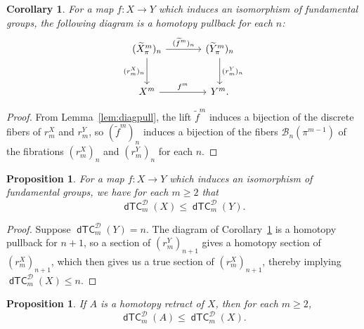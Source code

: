 \documentclass[amscd,amssymb,verbatim,11pt]{amsart}
\theoremstyle{plain}
\newtheorem{proposition}[thm]{Proposition}
\newtheorem{corollary}[thm]{Corollary}
\theoremstyle{definition}
\newcommand{\Wi}{\widetilde}
\DeclareMathOperator{\dTC}{{\mathsf{dTC}}}
\newcommand{\D}{\mathcal{D}}
\def\scr{\mathcal}
\def\B{{\scr B}}
\begin{document}
\begin{corollary}\label{cor:dTCDpull}
For a map $f\colon X \to Y$ which induces an isomorphism of fundamental groups, the following diagram is a homotopy pullback 
for each $n$:
\[
\begin{tikzcd}[column sep=large, row sep=large]
(\Wi{X}^m_\pi)_n \arrow{r}{(\Wi{f}^m)_n} \arrow{d}[swap]{(r^X_m)_n}
    &
    (\Wi{Y}^m_\pi)_n \arrow{d}{(r^Y_m)_n}
    \\
    X^m\arrow{r}{f^m}
    & 
    Y^m.
\end{tikzcd}
\]
\end{corollary}
\begin{proof} 
From Lemma~\ref{lem:diagpull}, the lift $\Wi f^m$ induces a bijection of the discrete fibers of $r_m^X$ and $r_m^Y$, so $(\Wi f^m)_n$ induces a bijection of the fibers $\B_n(\pi^{m-1})$ of the fibrations $(r_m^X)_n$ and $(r_m^Y)_n$ for each $n$. 
\end{proof}

\begin{proposition}\label{prop:pi1isodTCD}
For a map $f\colon X \to Y$ which induces an isomorphism of fundamental groups,
we have for each $m\ge 2$ that
$$\dTC_m^{\D}(X) \leq \dTC_m^{\D}(Y).$$
\end{proposition}
\begin{proof}
Suppose $\dTC^{\D}_m(Y)=n$. The diagram of Corollary~\ref{cor:dTCDpull} is a homotopy pullback for $n+1$, so a section of $(r^Y_m)_{n+1}$ gives a homotopy section of $(r^X_m)_{n+1}$, which then gives us a true section of $(r^X_m)_{n+1}$, thereby implying $\dTC^{\D}_m(X)\le n$.
\end{proof}


\begin{proposition}\label{prop:hretractdTCD}
If $A$ is a homotopy retract of $X$, then for each $m\ge 2$,
$$\dTC_m^{\D}(A) \leq \dTC_m^{\D}(X).$$
\end{proposition}
\end{document}
